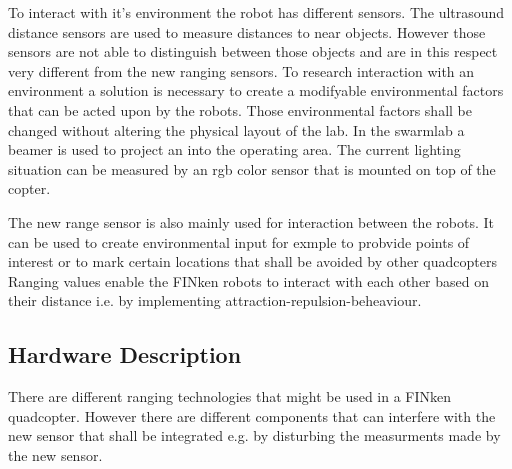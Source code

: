 To interact with it's environment the robot has different sensors.
The ultrasound distance sensors are used to measure distances to near objects.
However those sensors are not able to distinguish between those objects and are in this respect very different from the new ranging sensors.
To research interaction with an environment a solution is necessary to create a modifyable environmental factors that can be acted upon by the robots.
Those environmental factors shall be changed without altering the physical layout of the lab.
In the swarmlab a beamer is used to project an into the operating area.
The current lighting situation can be measured by an rgb color sensor that is mounted on top of the copter.

The new range sensor is also mainly used for interaction between the robots.
It can be used to create environmental input for exmple to probvide points of interest or to mark certain locations that shall be avoided by other quadcopters
Ranging values enable the FINken robots to interact with each other based on their distance i.e. by implementing attraction-repulsion-beheaviour. 

\subsection{Hardware Description}
There are different ranging technologies that might be used in a FINken quadcopter.
However there are different components that can interfere with the new sensor that shall be integrated e.g. by disturbing the measurments made by the new sensor.

